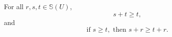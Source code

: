 For all $r, s, t \in \mathbb{S}(U)$,
$$s + t \geq t,$$
and
$$\text{if } s \geq t, \text{ then } s + r \geq t + r.$$
